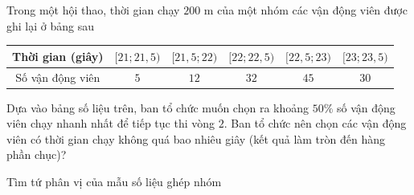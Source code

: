 \begin{vd}%
	Trong một hội thao, thời gian chạy $200$ m của một nhóm các vận động viên được ghi lại ở bảng sau
	\begin{center}
		\begin{tabular}{|c|c|c|c|c|c|}
			\hline
			Thời gian (giây) &$[21;21{,}5)$& $[21{,}5;22)$ &$[22;22{,}5)$&$[22{,}5;23)$ &$[23;23{,}5)$\\
			\hline
			Số vận động viên & $5$ & $12$ & $32$ & $45$ & $30$ \\
			\hline
		\end{tabular}
	\end{center}
	Dựa vào bảng số liệu trên, ban tổ chức muốn chọn ra khoảng $50\%$ số vận động viên chạy nhanh nhất để tiếp tục thi vòng $2$. Ban tổ chức nên chọn các vận động viên có thời gian chạy không quá bao nhiêu giây (kết quả làm tròn đến hàng phần chục)?
\end{vd}

\begin{dang}{Tìm tứ phân vị của mẫu số liệu ghép nhóm}
\end{dang}

